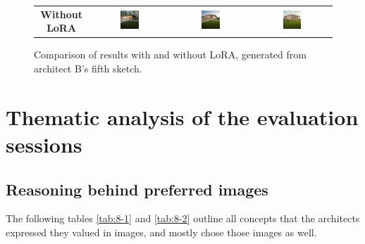 \begin{figure}[H]
{\begin{tabular}{c c c c}
    \textbf{Without LoRA} &
    \includegraphics[width=0.25\textwidth]{Images/Results/Architect-B_unstructured-phase/generated_images/5/Zonder_lora_00029_.png} &
    \includegraphics[width=0.25\textwidth]{Images/Results/Architect-B_unstructured-phase/generated_images/5/Zonder_lora_00030_.png} & \includegraphics[width=0.25\textwidth]{Images/Results/Architect-B_unstructured-phase/generated_images/5/Zonder_lora_00032_.png} \\
  \end{tabular}
  }
  \caption{Comparison of results with and without LoRA, generated from architect B's fifth sketch.}
  \label{fig:lora-comparison-2wide}
\end{figure}


\section{Thematic analysis of the evaluation sessions}\label{sec:results-analysis}
\subsection{Reasoning behind preferred images}
The following tables \ref{tab:8-1} and \ref{tab:8-2} outline all concepts that the architects expressed they valued in images, and mostly chose those images as well.

